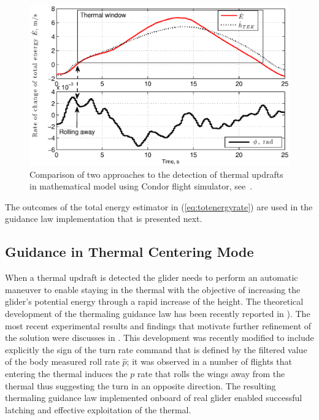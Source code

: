 \documentclass{ifacconf}
\begin{document}
\begin{figure}[thpb]
  \centering
  \includegraphics[scale=0.49]{Figures/TEK_Bank.eps}
  \caption{Comparison of two approaches to the detection of thermal updrafts in mathematical model using Condor flight simulator, see~\cite{Condor:2013:Online}. }
  \label{fig:ThermalDetection}
\end{figure}

The outcomes of the total energy estimator in (\ref{eq:totenergyrate}) are used in the guidance law implementation that is presented next.

\subsection{Guidance in Thermal Centering Mode}
\label{subsec:ThermGuidance}
When a thermal updraft is detected the glider needs to perform an automatic maneuver to enable staying in the thermal with the objective of increasing the glider's potential energy through a rapid increase of the height. The theoretical development of the thermaling guidance law has been recently reported in \cite{AKlass_JGCD:2012}). The most recent experimental results and findings that motivate further refinement of the solution were discusses in \cite{AKlass_CDC:2012}. This development was recently modified to include explicitly the sign of the turn rate command that is defined by the filtered value of the body measured roll rate $\hat{p}$; it was observed in a number of flights that entering the thermal induces the $p$ rate that rolls the wings away from the thermal thus suggesting the turn in an opposite direction. The resulting thermaling guidance law implemented onboard of real glider enabled successful latching and effective exploitation of the thermal.
\end{document}
